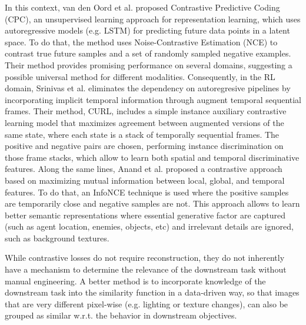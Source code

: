 In this context, van den Oord et al. \cite{oord2018representation} proposed Contrastive Predictive Coding (CPC), an unsupervised learning approach for representation learning, which uses autoregressive models (e.g. LSTM) for predicting future data points in a latent space. To do that, the method uses Noise-Contrastive Estimation (NCE) to contrast true future samples and a set of randomly sampled negative examples. Their method provides promising performance on several domains, suggesting a possible universal method for different modalities. Consequently, in the RL domain, Srinivas et al. \cite{laskin2020curl} eliminates the dependency on autoregresive pipelines by incorporating implicit temporal information through augment temporal sequential frames. Their method, CURL, includes a simple instance auxiliary contrastive learning model that maximizes agreement between augmented versions of the same state, where each state is a stack of temporally sequential frames. The positive and negative pairs are chosen, performing instance discrimination on those frame stacks, which allow to learn both spatial and temporal discriminative features. Along the same lines, Anand et al. \cite{anand2019unsupervised} proposed a contrastive approach based on maximizing mutual information between local, global, and temporal features. To do that, an InfoNCE technique is used where the positive samples are temporarily close and negative samples are not. This approach allows to learn better semantic representations where essential generative factor are captured (such as agent location, enemies, objects, etc) and irrelevant details are ignored, such as background textures.




While contrastive losses do not require reconstruction, they do not inherently have a mechanism to determine the relevance of the downstream task without manual engineering. A better method is to incorporate knowledge of the downstream task into the similarity function in a data-driven way, so that images that are very different pixel-wise (e.g. lighting or texture changes), can also be grouped as similar w.r.t. the behavior in downstream objectives.

